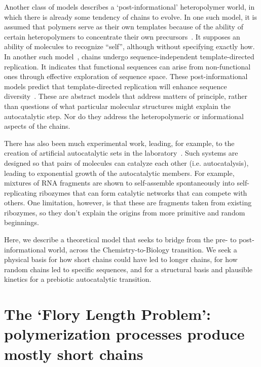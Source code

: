 \documentclass[twocolumn,letterpaper]{revtex4}
\begin{document}
 Another class of models describes a `post-informational' heteropolymer world, in which there is 
already some tendency of chains to evolve.  In one such model, it is assumed that polymers serve 
as 
their own templates because of the ability of certain heteropolymers to concentrate their own 
precursors~\cite{nowak2008prevolutionary,Ohtsuki2009,Chen2012,Derr2012}.  It supposes an ability 
of 
molecules to recognize ``self'', although without specifying exactly how.  In another such 
model~\cite{Walker2012}, chains undergo sequence-independent template-directed replication.  It 
indicates that functional sequences can arise from non-functional ones through effective 
exploration of sequence space.  These post-informational models predict that template-directed 
replication will enhance sequence diversity~\cite{Derr2012}.   These are abstract models that 
address matters of principle, rather than questions of what particular molecular structures might 
explain the autocatalytic step. Nor do they address the heteropolymeric or informational aspects 
of 
the chains.
 
 There has also been much experimental work, leading, for example, to the creation of artificial 
autocatalytic sets in the laboratory~\cite{VonKiedrowski1986,Lincoln2009,Vaidya2012}. Such systems 
are designed so that pairs of molecules can catalyze each other (i.e. autocatalysis), leading to 
exponential growth of the autocatalytic members.  For example, mixtures of RNA fragments are shown 
to self-assemble spontaneously into self-replicating ribozymes that can form catalytic networks 
that can compete with others\cite{Robertson2014}.  One limitation, however, is that these are 
fragments 
taken from existing ribozymes, so they don't explain the origins from more primitive and random 
beginnings.
 
  Here, we describe a theoretical model that seeks to bridge from the pre- to post-informational 
world, across the Chemistry-to-Biology transition.  We seek a physical basis for how short chains 
could have led to longer chains, for how random chains led to specific sequences, and for a 
structural basis and plausible kinetics for a prebiotic autocatalytic transition.
   
 \section*{The `Flory Length Problem': polymerization processes produce mostly short chains}
 \label{sec:flory} 
\end{document}
